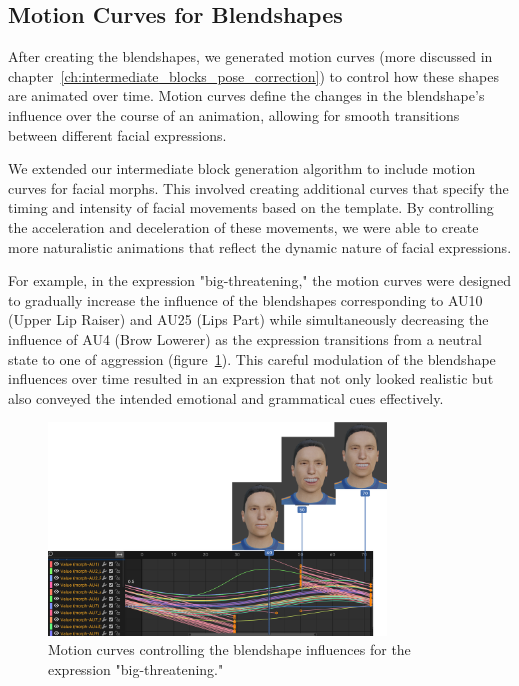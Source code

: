 \documentclass[../../main]{subfiles}
\begin{document}
\subsection{Motion Curves for Blendshapes}
\label{ch:facial_expressions:motion_curves_for_blendshapes}

After creating the blendshapes, we generated motion curves (more discussed in chapter~\ref{ch:intermediate_blocks_pose_correction}) to control how these shapes are animated over time. Motion curves define the changes in the blendshape's influence over the course of an animation, allowing for smooth transitions between different facial expressions.

We extended our intermediate block generation algorithm to include motion curves for facial morphs. This involved creating additional curves that specify the timing and intensity of facial movements based on the template. By controlling the acceleration and deceleration of these movements, we were able to create more naturalistic animations that reflect the dynamic nature of facial expressions.

For example, in the expression "big-threatening," the motion curves were designed to gradually increase the influence of the blendshapes corresponding to AU10 (Upper Lip Raiser) and AU25 (Lips Part) while simultaneously decreasing the influence of AU4 (Brow Lowerer) as the expression transitions from a neutral state to one of aggression (figure~\ref{ch:facial_expressions:fig:motion_curve_example}). This careful modulation of the blendshape influences over time resulted in an expression that not only looked realistic but also conveyed the intended emotional and grammatical cues effectively.

\begin{figure}
    \centering
    \includegraphics[width=0.8\textwidth]{chapters/facial_expressions/images/motion_curve_example.png}
    \caption{Motion curves controlling the blendshape influences for the expression "big-threatening."}
    \label{ch:facial_expressions:fig:motion_curve_example}
\end{figure}
\end{document}
